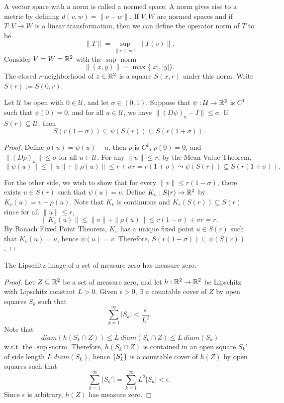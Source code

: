 A vector space with a norm is called a normed space. A norm gives rise to a metric by defining $d(v, w) = \|v - w\|.$ If $V, W$ are normed spaces and if $T: V \to W$ is a linear transformation, then we can define the operator norm of $T$ to be
\[
\|T\| = \sup_{\|v\| = 1} \|T(v)\|.
\]
Consider $V = W = {\mathbb R}^2$ with the $\sup$-norm
\[
\|(x, y)\| = \max\{|x|, |y|\}.
\]
The closed $r$-neighborhood of $z \in {\mathbb R}^2$ is a square $S(x, r)$ under this norm. Write $S(r) := S(0, r)$.

\begin{lm}
    Let $\mathcal U$ be open with $0 \in \mathcal U$, and let $\sigma \in (0, 1)$. Suppose that $\psi: \mathcal U \to {\mathbb R}^2$ is $C^1$ such that $\psi(0) = 0$, and for all $u \in \mathcal U$, we have $\|(D\psi)_u - I\| \leq \sigma$. If $S(r) \subseteq \mathcal U$, then
    \[
    S(r(1 - \sigma)) \subseteq \psi(S(r)) \subseteq S(r(1 + \sigma)).
    \]
    \begin{proof}
        Define $\rho(u) = \psi(u) - u$, then $\rho$ is $C^1$, $\rho(0) = 0$, and $\|(D\rho)_u\| \leq \sigma$ for all $u \in \mathcal U$. For any $\|u\| \leq r$, by the Mean Value Theorem, 
        \[
        \|\psi(u)\| \leq \|u\| + \|\rho(u)\| \leq r + \sigma r = r(1 + \sigma) \leadsto \psi(S(r)) \subseteq S(r(1 + \sigma)).
        \]

        For the other side, we wish to show that for every $\|v\| \leq r(1 - \sigma)$, there exists $u \in S(r)$ such that $\psi(u) = v$. Define $K_v: S(r) \to {\mathbb R}^2$ by $K_v(u) = v - \rho(u)$. Note that $K_v$ is continuous and $K_v(S(r)) \subseteq S(r)$ since for all $\|u\| \leq r$,
        \[
        \|K_v(u)\| \leq \|v\| + \|\rho(u)\| \leq r(1 - \sigma) + \sigma r = r.
        \]
        By Banach Fixed Point Theorem, $K_v$ has a unique fixed point $u \in S(r)$ such that $K_v(u) = u$, hence $\psi(u) = v$. Therefore, $S(r(1 - \sigma)) \subseteq \psi(S(r))$.
    \end{proof}
\end{lm}

\begin{lm}
    \label{lm:lipschitz_measure_zero}
    The Lipschitz image of a set of measure zero has measure zero.
    \begin{proof}
        Let $Z \subseteq {\mathbb R}^2$ be a set of measure zero, and let $h: {\mathbb R}^2 \to {\mathbb R}^2$ be Lipschitz with Lipschitz constant $L > 0$. Given $\epsilon > 0$, $\exists$ a countable cover of $Z$ by open squares $S_k$ such that
        \[
        \sum_{k=1}^\infty |S_k| < \frac{\epsilon}{L^2}.
        \]
        Note that
        \[
        ~diam (h(S_k \cap Z)) \leq L ~diam (S_k \cap Z) \leq L ~diam (S_k)
        \]
        w.r.t. the $\sup$-norm. Therefore, $h(S_k \cap Z)$ is contained in an open square $S_k'$ of side length $L ~diam (S_k)$, hence ${\left\{{S_k'}\right\}}$ is a countable cover of $h(Z)$ by open squares such that
        \[
        \sum_{k=1}^\infty |S_k'| = \sum_{k=1}^\infty L^2 |S_k| < \epsilon.
        \]
        Since $\epsilon$ is arbitrary, $h(Z)$ has measure zero.
    \end{proof}
\end{lm}

